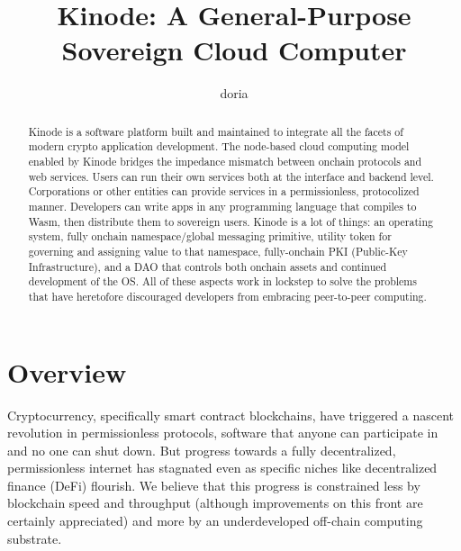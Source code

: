 \documentclass[runningheads]{llncs}
\begin{document}
%
\title{Kinode: A General-Purpose Sovereign Cloud Computer}
%
%
\author{doria %
}
%
%
\institute{ }
%
\maketitle              %
%
\begin{abstract}
Kinode is a software platform built and maintained to integrate all the facets of modern crypto application development.
The node-based cloud computing model enabled by Kinode bridges the impedance mismatch between onchain protocols and web services.
Users can run their own services both at the interface and backend level.
Corporations or other entities can provide services in a permissionless, protocolized manner.
Developers can write apps in any programming language that compiles to Wasm, then distribute them to sovereign users.
Kinode is a lot of things: an operating system, fully onchain namespace/global messaging primitive, utility token for governing and assigning value to that namespace, fully-onchain PKI (Public-Key Infrastructure), and a DAO that controls both onchain assets and continued development of the OS.
All of these aspects work in lockstep to solve the problems that have heretofore discouraged developers from embracing peer-to-peer computing.

\end{abstract}
%
%
%
\tableofcontents
%
%
%
\section{Overview}

Cryptocurrency, specifically smart contract blockchains, have triggered a nascent revolution in permissionless protocols, software that anyone can participate in and no one can shut down.
But progress towards a fully decentralized, permissionless internet has stagnated even as specific niches like decentralized finance (DeFi) flourish.
We believe that this progress is constrained less by blockchain speed and throughput (although improvements on this front are certainly appreciated) and more by an underdeveloped off-chain computing substrate.
\end{document}
